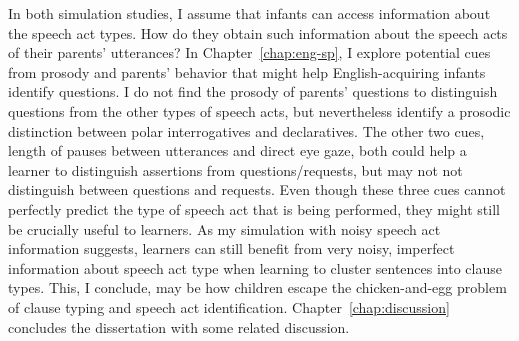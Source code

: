 In both simulation studies, I assume that infants can access information about the speech act types. How do they obtain such information about the speech acts of their parents' utterances? In Chapter~\ref{chap:eng-sp}, I explore potential cues from prosody and parents' behavior that might help English-acquiring infants identify questions. I do not find the prosody of parents' questions to distinguish questions from the other types of speech acts, but nevertheless identify a prosodic distinction between polar interrogatives and declaratives. The other two cues, length of pauses between utterances and direct eye gaze, both could help a learner to distinguish assertions from questions/requests, but may not not distinguish between questions and requests. Even though these three cues cannot perfectly predict the type of speech act that is being performed, they might still be crucially useful to learners. As my simulation with noisy speech act information suggests, learners can still benefit from very noisy, imperfect information about speech act type when learning to cluster sentences into clause types. This, I conclude, may be how children escape the chicken-and-egg problem of clause typing and speech act identification. Chapter~\ref{chap:discussion} concludes the dissertation with some related discussion.


